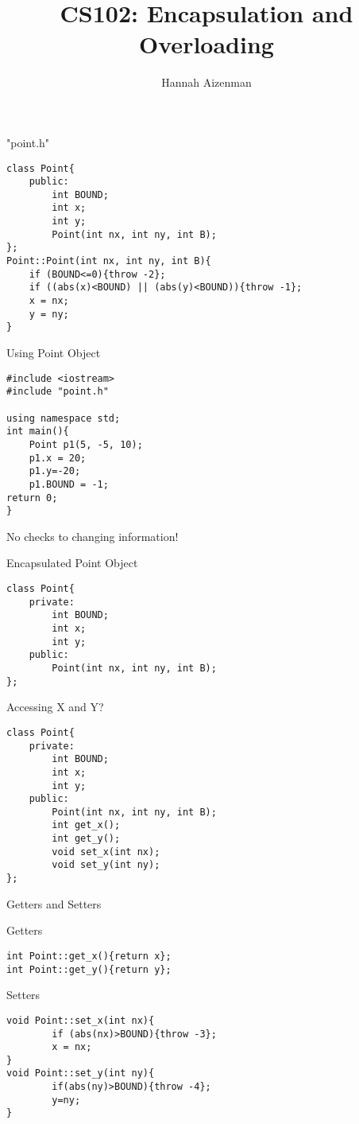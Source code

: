 \documentclass[xcolor={dvipsnames}]{beamer}
\begin{document}
\title{ CS102: Encapsulation and Overloading}
\author{Hannah Aizenman}

\begin{frame}
	\titlepage
\end{frame}


\begin{frame}[fragile]{"point.h"}
\begin{verbatim}
class Point{
    public:
        int BOUND;
        int x;
        int y;
        Point(int nx, int ny, int B);
};
Point::Point(int nx, int ny, int B){
    if (BOUND<=0){throw -2};
    if ((abs(x)<BOUND) || (abs(y)<BOUND)){throw -1};
    x = nx;
    y = ny;
}
\end{verbatim}
\end{frame}

\begin{frame}[fragile]{Using Point Object}
\begin{verbatim}
#include <iostream>
#include "point.h"

using namespace std;
int main(){
    Point p1(5, -5, 10);
    p1.x = 20;
    p1.y=-20;
    p1.BOUND = -1;
return 0;
}
\end{verbatim}
\pause
\begin{center}
\huge
No checks to changing information!
\end{center}
\end{frame}

\begin{frame}[fragile]{Encapsulated Point Object}
\begin{verbatim}
class Point{
    private:
        int BOUND;
        int x;
        int y;
    public:
        Point(int nx, int ny, int B);
};

\end{verbatim}
\end{frame}

\begin{frame}[fragile]{Accessing X and Y?}
\begin{verbatim}
class Point{
    private:
        int BOUND;
        int x;
        int y;
    public:
        Point(int nx, int ny, int B);
        int get_x();
        int get_y();
        void set_x(int nx);
        void set_y(int ny);
};
\end{verbatim}
\end{frame}

\begin{frame}[fragile]{Getters and Setters}
\begin{block}{Getters}
\begin{verbatim}
int Point::get_x(){return x};
int Point::get_y(){return y};
\end{verbatim}
\end{block}

\begin{block}{Setters}
\begin{verbatim}
void Point::set_x(int nx){
        if (abs(nx)>BOUND){throw -3};
        x = nx;
}
void Point::set_y(int ny){
        if(abs(ny)>BOUND){throw -4};
        y=ny;
}
\end{verbatim}
\end{block}

\end{frame}
\end{document}
